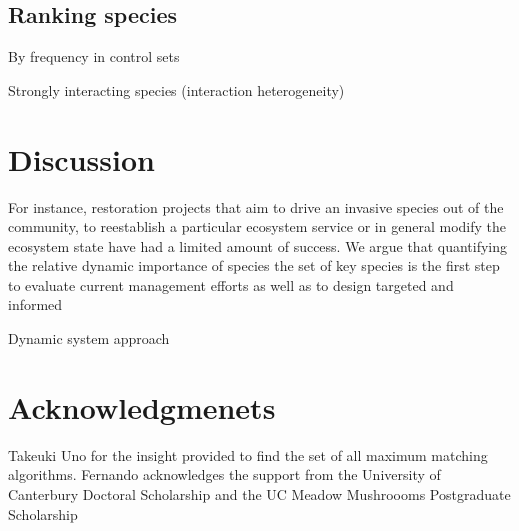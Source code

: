 \subsection*{Ranking species}

By frequency in control sets

Strongly interacting species (interaction heterogeneity)

\section*{Discussion}

 For instance, restoration projects that aim to drive an invasive species out of the community, to reestablish a particular ecosystem service or in general modify the ecosystem state have had a limited amount of success. We argue that quantifying the relative dynamic importance of species the set of key species is the first step to evaluate current management efforts as well as to design targeted and informed 
 
 Dynamic system approach
 
\section*{Acknowledgmenets}

Takeuki Uno for the insight provided to find the set of all maximum matching algorithms. Fernando acknowledges the support from the University of Canterbury Doctoral Scholarship and the UC Meadow Mushroooms Postgraduate Scholarship



